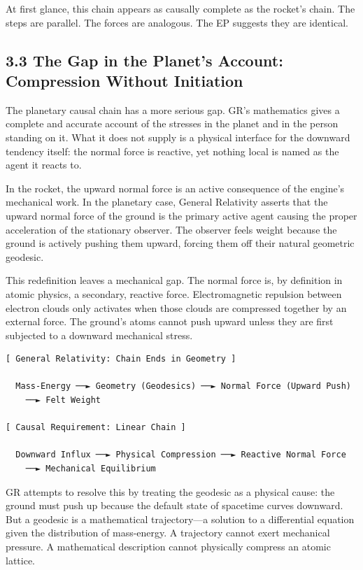 \documentclass[11pt]{article}
\begin{document}
At first glance, this chain appears as causally complete as the rocket's chain. The steps are parallel. The forces are analogous. The EP suggests they are identical.

\subsection{3.3 The Gap in the Planet's Account: Compression Without Initiation}

The planetary causal chain has a more serious gap. GR's mathematics gives a complete and accurate account of the stresses in the planet and in the person standing on it. What it does not supply is a physical interface for the downward tendency itself: the normal force is reactive, yet nothing local is named as the agent it reacts to.

In the rocket, the upward normal force is an active consequence of the engine's mechanical work. In the planetary case, General Relativity asserts that the upward normal force of the ground is the primary active agent causing the proper acceleration of the stationary observer. The observer feels weight because the ground is actively pushing them upward, forcing them off their natural geometric geodesic.

This redefinition leaves a mechanical gap. The normal force is, by definition in atomic physics, a secondary, reactive force. Electromagnetic repulsion between electron clouds only activates when those clouds are compressed together by an external force. The ground's atoms cannot push upward unless they are first subjected to a downward mechanical stress.

\par\noindent\begin{minipage}{\linewidth}
\begin{verbatim}
[ General Relativity: Chain Ends in Geometry ]

  Mass-Energy ──► Geometry (Geodesics) ──► Normal Force (Upward Push)
    ──► Felt Weight

[ Causal Requirement: Linear Chain ]

  Downward Influx ──► Physical Compression ──► Reactive Normal Force
    ──► Mechanical Equilibrium
\end{verbatim}
\end{minipage}\par

GR attempts to resolve this by treating the geodesic as a physical cause: the ground must push up because the default state of spacetime curves downward. But a geodesic is a mathematical trajectory---a solution to a differential equation given the distribution of mass-energy. A trajectory cannot exert mechanical pressure. A mathematical description cannot physically compress an atomic lattice.
\end{document}
